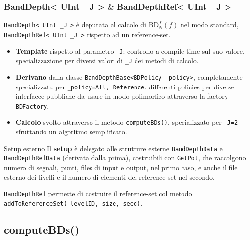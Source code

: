 \documentclass[9pt]{beamer}
\begin{document}
\begin{frame}
\frametitle{\ttfamily BandDepth< UInt \_J > $\&$ BandDepthRef< UInt \_J > }
\texttt{BandDepth< UInt \_J >} \`e deputata al calcolo di $\text{BD}^J_N(f)$ nel modo standard, \texttt{BandDepthRef< UInt \_J >} rispetto ad un reference-set.
\begin{itemize}
 \item \textbf{Template} rispetto al parametro \texttt{\_J}: controllo a compile-time sul suo valore, specializzazione per diversi valori di \texttt{\_J} dei metodi di calcolo.
 \item \textbf{Derivano} dalla classe \texttt{BandDepthBase<BDPolicy \_policy>}, completamente specializzata per \texttt{\_policy=\texttt{All}, \texttt{Reference}}: 
	   differenti policies per diverse interfacce pubbliche da usare in modo polimorfico attraverso la factory \texttt{BDFactory}. 
  \item \textbf{Calcolo} svolto attraverso il metodo \texttt{computeBDs()}, specializzato per \texttt{\_J=2} sfruttando un algoritmo semplificato.
\end{itemize}
\begin{block}{Setup esterno}
Il \textbf{setup} \`e delegato alle strutture esterne \texttt{BandDepthData} e \texttt{BandDepthRefData} (derivata dalla prima), costruibili con \texttt{GetPot}, 
che raccolgono numero di segnali, punti, files di input e output, nel primo caso, e anche  il file esterno dei livelli e il numero di elementi del reference-set nel secondo. 
\end{block}

\vskip 10pt
\texttt{BandDepthRef} permette di costruire il reference-set col metodo \texttt{addToReferenceSet( }\texttt{levelID, size, seed)}.
\end{frame}


\subsection{computeBDs()}
\end{document}
